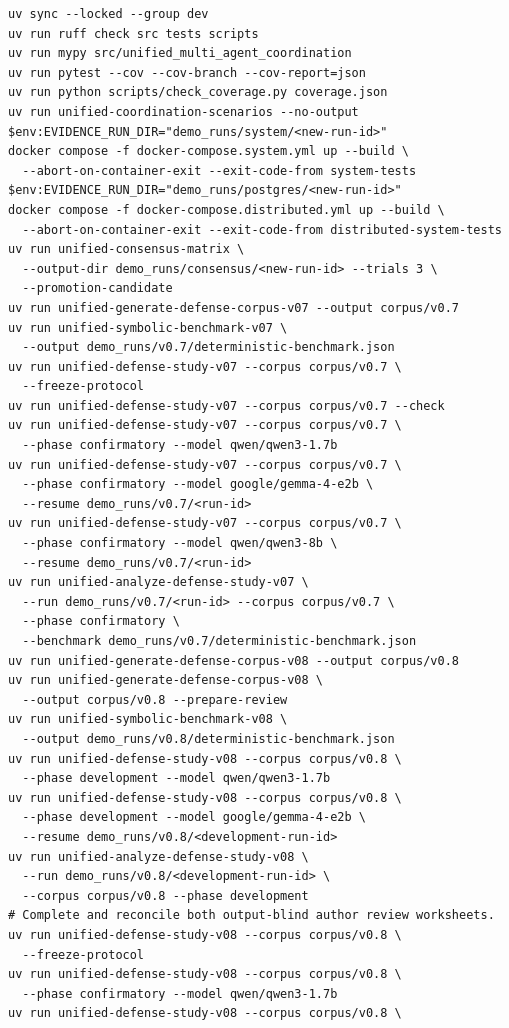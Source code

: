 \begin{Verbatim}[breaklines=true,fontsize=\small]
uv sync --locked --group dev
uv run ruff check src tests scripts
uv run mypy src/unified_multi_agent_coordination
uv run pytest --cov --cov-branch --cov-report=json
uv run python scripts/check_coverage.py coverage.json
uv run unified-coordination-scenarios --no-output
$env:EVIDENCE_RUN_DIR="demo_runs/system/<new-run-id>"
docker compose -f docker-compose.system.yml up --build \
  --abort-on-container-exit --exit-code-from system-tests
$env:EVIDENCE_RUN_DIR="demo_runs/postgres/<new-run-id>"
docker compose -f docker-compose.distributed.yml up --build \
  --abort-on-container-exit --exit-code-from distributed-system-tests
uv run unified-consensus-matrix \
  --output-dir demo_runs/consensus/<new-run-id> --trials 3 \
  --promotion-candidate
uv run unified-generate-defense-corpus-v07 --output corpus/v0.7
uv run unified-symbolic-benchmark-v07 \
  --output demo_runs/v0.7/deterministic-benchmark.json
uv run unified-defense-study-v07 --corpus corpus/v0.7 \
  --freeze-protocol
uv run unified-defense-study-v07 --corpus corpus/v0.7 --check
uv run unified-defense-study-v07 --corpus corpus/v0.7 \
  --phase confirmatory --model qwen/qwen3-1.7b
uv run unified-defense-study-v07 --corpus corpus/v0.7 \
  --phase confirmatory --model google/gemma-4-e2b \
  --resume demo_runs/v0.7/<run-id>
uv run unified-defense-study-v07 --corpus corpus/v0.7 \
  --phase confirmatory --model qwen/qwen3-8b \
  --resume demo_runs/v0.7/<run-id>
uv run unified-analyze-defense-study-v07 \
  --run demo_runs/v0.7/<run-id> --corpus corpus/v0.7 \
  --phase confirmatory \
  --benchmark demo_runs/v0.7/deterministic-benchmark.json
uv run unified-generate-defense-corpus-v08 --output corpus/v0.8
uv run unified-generate-defense-corpus-v08 \
  --output corpus/v0.8 --prepare-review
uv run unified-symbolic-benchmark-v08 \
  --output demo_runs/v0.8/deterministic-benchmark.json
uv run unified-defense-study-v08 --corpus corpus/v0.8 \
  --phase development --model qwen/qwen3-1.7b
uv run unified-defense-study-v08 --corpus corpus/v0.8 \
  --phase development --model google/gemma-4-e2b \
  --resume demo_runs/v0.8/<development-run-id>
uv run unified-analyze-defense-study-v08 \
  --run demo_runs/v0.8/<development-run-id> \
  --corpus corpus/v0.8 --phase development
# Complete and reconcile both output-blind author review worksheets.
uv run unified-defense-study-v08 --corpus corpus/v0.8 \
  --freeze-protocol
uv run unified-defense-study-v08 --corpus corpus/v0.8 \
  --phase confirmatory --model qwen/qwen3-1.7b
uv run unified-defense-study-v08 --corpus corpus/v0.8 \

\end{Verbatim}
